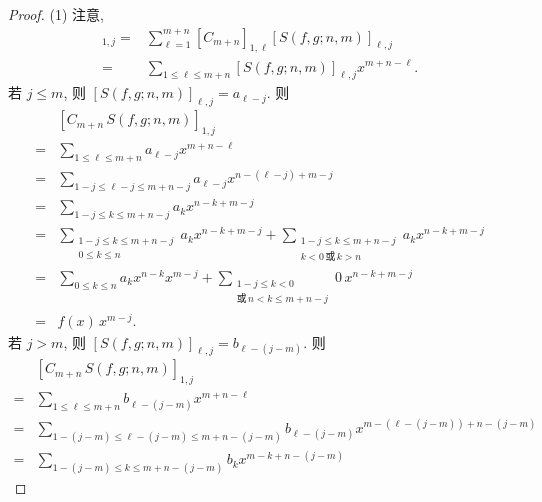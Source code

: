 \documentclass[../libro.tex]{subfiles}
\begin{document}
\begin{proof}
    (1)
    注意,
    \begin{align*}
        [C_{m+n}\, S(f, g; n, m)]_{1,j}
        = {} &
        \sum_{\ell = 1}^{m+n}
        {[C_{m+n}]_{1,\ell} [S(f, g; n, m)]_{\ell,j}}
        \\
        = {} &
        \sum_{1 \leq \ell \leq m+n}
        {[S(f, g; n, m)]_{\ell,j} x^{m+n-\ell}}.
    \end{align*}
    若 \(j \leq m\), 则
    \([S(f, g; n, m)]_{\ell,j} = a_{\ell-j}\).
    则
    \begin{align*}
        &
        [C_{m+n}\, S(f, g; n, m)]_{1,j}
        \\
        = {} &
        \sum_{1 \leq \ell \leq m+n}
        {a_{\ell-j} x^{m+n-\ell}}
        \\
        = {} &
        \sum_{1-j \leq \ell-j \leq m+n-j}
        {a_{\ell-j} x^{n-(\ell-j)+m-j}}
        \\
        = {} &
        \sum_{1-j \leq k \leq m+n-j}
        {a_k x^{n-k+m-j}}
        \\
        = {} &
        \sum_{\substack{
                1-j \leq k \leq m+n-j \\
                0 \leq k \leq n
        }}
        {a_k x^{n-k+m-j}}
        +
        \sum_{\substack{
                1-j \leq k \leq m+n-j \\
                k < 0 \,\text{或}\, k > n
        }}
        {a_k x^{n-k+m-j}}
        \\
        = {} &
        \sum_{0 \leq k \leq n}
        {a_k x^{n-k} x^{m-j}}
        +
        \sum_{\substack{
                1-j \leq k < 0 \\
                \text{或}\, n < k \leq m+n-j
        }}
        {0\, x^{n-k+m-j}}
        \\
        = {} &
        f(x)\, x^{m-j}.
    \end{align*}
    若 \(j > m\), 则
    \([S(f, g; n, m)]_{\ell,j} = b_{\ell-(j-m)}\).
    则
    \begin{align*}
        &
        [C_{m+n}\, S(f, g; n, m)]_{1,j}
        \\
        = {} &
        \sum_{1 \leq \ell \leq m+n}
        {b_{\ell-(j-m)} x^{m+n-\ell}}
        \\
        = {} &
        \sum_{1-(j-m) \leq \ell-(j-m) \leq m+n-(j-m)}
        {b_{\ell-(j-m)} x^{m-(\ell-(j-m))+n-(j-m)}}
        \\
        = {} &
        \sum_{1-(j-m) \leq k \leq m+n-(j-m)}
        {b_k x^{m-k+n-(j-m)}}

\end{align*}
\end{proof}
\end{document}
